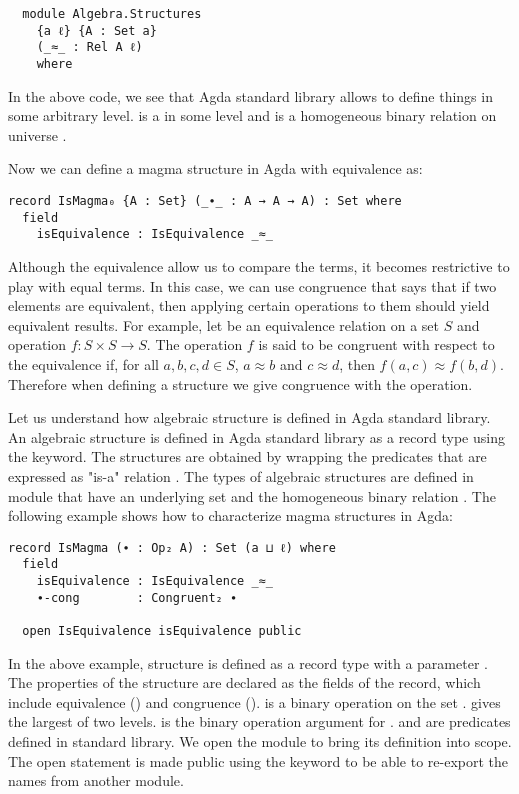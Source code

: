 \begin{verbatim}
  module Algebra.Structures
    {a ℓ} {A : Set a} 
    (_≈_ : Rel A ℓ)    
    where
  \end{verbatim} 

In the above code, we see that Agda standard library allows to define things in
some arbitrary level.  is a  in some level  and
 is a homogeneous binary relation  on universe .

Now we can define a magma structure in Agda with equivalence as:

\begin{verbatim}
record IsMagma₀ {A : Set} (_∙_ : A → A → A) : Set where
  field
    isEquivalence : IsEquivalence _≈_
\end{verbatim}

Although the equivalence allow us to compare the terms, it becomes restrictive
to play with equal terms. In this case, we can use congruence  that says that if
two elements are equivalent, then applying certain operations to them should
yield equivalent results. For example, let  be an equivalence relation
on a set $S$ and operation $f : S × S → S$. The operation $f$ is said to be
congruent with respect to the equivalence if, for all $a, b, c, d \in S$, $a ≈
b$ and $c ≈ d$, then $f(a, c) ≈ f(b, d)$. Therefore when defining a structure we
give congruence with the operation.

Let us understand how algebraic structure is defined in Agda standard library.
An algebraic structure is defined in Agda standard library as a record type
using the  keyword. The structures are obtained by wrapping the
predicates that are expressed as "is-a" relation \cite{hu2021formalizing}. The
types of algebraic structures are defined in module 
that have an underlying set  and the homogeneous binary relation
. The following example shows how to characterize magma structures in
Agda:

\begin{verbatim}
record IsMagma (∙ : Op₂ A) : Set (a ⊔ ℓ) where
  field
    isEquivalence : IsEquivalence _≈_
    ∙-cong        : Congruent₂ ∙

  open IsEquivalence isEquivalence public
\end{verbatim}

In the above example, structure  is defined as a record type
with a parameter . The properties of the structure
 are declared as the fields of the record, which include
equivalence () and congruence ().
 is a binary operation on the set .  gives the
largest of two levels.  is the binary operation argument for
.  and  are
predicates defined in standard library. We open the module
 to bring its definition into scope. The open statement is
made public using the keyword  to be able to re-export the names
from another module.

